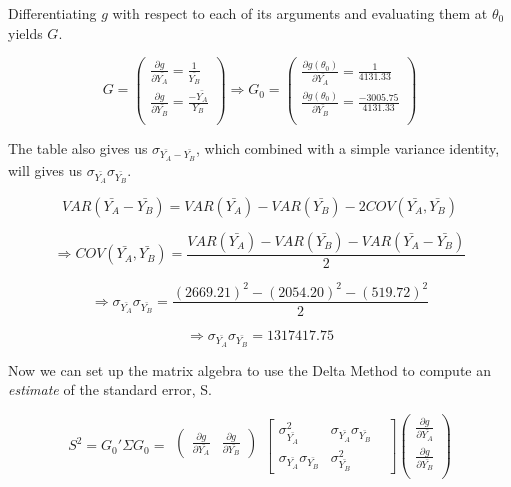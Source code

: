 \documentclass[11pt]{article}
\begin{document}
\bigskip Differentiating $g$ with respect to each of its arguments and evaluating them at $\theta_0$ yields $G$.

\[G =
\left(
\begin{array}{c}
\frac{\partial g}{\partial \bar{Y_A}} = \frac{1}{\bar{Y_B}}\\
\frac{\partial g}{\partial \bar{Y_B}} = \frac{-\bar{Y_A}}{Y_B}\\
\end{array}
\right)
\Rightarrow 
G_0 =
\left(
\begin{array}{c}
\frac{\partial g(\theta_0)}{\partial \bar{Y_A}}=\frac{1}{4131.33}\\
\frac{\partial g(\theta_0)}{\partial \bar{Y_B}}=\frac{-3005.75}{4131.33}\\
\end{array}
\right)
\]

The table also gives us $\sigma_{\bar{Y_A}-\bar{Y_B}}$, which combined with a simple variance identity, will gives us $\sigma_{\bar{Y_A}}\sigma_{\bar{Y_B}}$.

\[VAR(\bar{Y_A}-\bar{Y_B})=VAR(\bar{Y_A})-VAR(\bar{Y_B})-2COV(\bar{Y_A},\bar{Y_B})\]

\[\Rightarrow COV(\bar{Y_A},\bar{Y_B})=\frac{VAR(\bar{Y_A})-VAR(\bar{Y_B})-VAR(\bar{Y_A}-\bar{Y_B})}{2}\]

\[\Rightarrow \sigma_{\bar{Y_A}}\sigma_{\bar{Y_B}}=\frac{(2669.21)^2-(2054.20)^2-(519.72)^2}{2}\]

\[\Rightarrow \sigma_{\bar{Y_A}}\sigma_{\bar{Y_B}}=1317417.75\]

Now we can set up the matrix algebra to use the Delta Method to compute an \textit{estimate} of the standard error, S.

\[S^2 = G_0' \Sigma G_0 = \begin{matrix}\begin{pmatrix}\frac{\partial g}{\partial \bar{Y_A}} & \frac{\partial g}{\partial \bar{Y_B}}\end{pmatrix}\\\mbox{}\end{matrix}
\begin{bmatrix}
\sigma_{\bar{Y_A}}^2 & \sigma_{\bar{Y_A}}\sigma_{\bar{Y_B}} & \\
\sigma_{\bar{Y_A}}\sigma_{\bar{Y_B}} & \sigma_{\bar{Y_B}}^2 &
\end{bmatrix}
\left(\begin{array}{c}
\frac{\partial g}{\partial \bar{Y_A}}\\
\frac{\partial g}{\partial \bar{Y_B}}\\
\end{array}
\right)
\]
\end{document}
